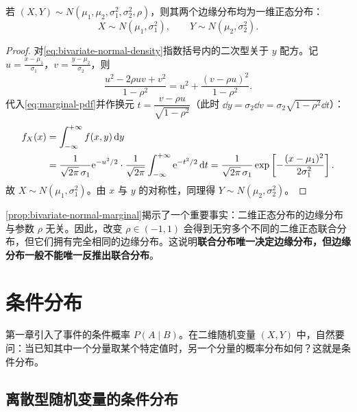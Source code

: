 \begin{proposition}[二维正态分布的边缘分布]
\label{prop:bivariate-normal-marginal}
若 $(X,Y)\sim N(\mu_1,\mu_2,\sigma_1^2,\sigma_2^2,\rho)$，则其两个边缘分布均为一维正态分布：
\[
  X\sim N(\mu_1,\sigma_1^2),\qquad Y\sim N(\mu_2,\sigma_2^2).
\]
\end{proposition}
\begin{proof}
对\eqref{eq:bivariate-normal-density}指数括号内的二次型关于 $y$ 配方。记 $u=\frac{x-\mu_1}{\sigma_1}$，$v=\frac{y-\mu_2}{\sigma_2}$，则
\[
  \frac{u^2-2\rho uv+v^2}{1-\rho^2}
  =u^2+\frac{(v-\rho u)^2}{1-\rho^2}.
\]
代入\eqref{eq:marginal-pdf}并作换元 $t=\dfrac{v-\rho u}{\sqrt{1-\rho^2}}$（此时 $\dd y=\sigma_2\dd v=\sigma_2\sqrt{1-\rho^2}\dd t$）：
\[
\begin{aligned}
  f_X(x)&=\int_{-\infty}^{+\infty}f(x,y)\mathop{}\!\mathrm{d} y\\
  &=\frac{1}{\sqrt{2\pi}\,\sigma_1}\mathrm{e}^{-u^2/2}\cdot
  \frac{1}{\sqrt{2\pi}}\int_{-\infty}^{+\infty}\mathrm{e}^{-t^2/2}\mathop{}\!\mathrm{d} t
  =\frac{1}{\sqrt{2\pi}\,\sigma_1}\exp\left[-\frac{(x-\mu_1)^2}{2\sigma_1^2}\right].
\end{aligned}
\]
故 $X\sim N(\mu_1,\sigma_1^2)$。由 $x$ 与 $y$ 的对称性，同理得 $Y\sim N(\mu_2,\sigma_2^2)$。
\end{proof}

\cref{prop:bivariate-normal-marginal}揭示了一个重要事实：二维正态分布的边缘分布与参数 $\rho$ 无关。因此，改变 $\rho\in(-1,1)$ 会得到无穷多个不同的二维正态联合分布，但它们拥有完全相同的边缘分布。这说明\textbf{联合分布唯一决定边缘分布，但边缘分布一般不能唯一反推出联合分布}。

\section{条件分布}
\label{sec:conditional-distribution}

第一章引入了事件的条件概率 $P(A\mid B)$。在二维随机变量 $(X,Y)$ 中，自然要问：当已知其中一个分量取某个特定值时，另一个分量的概率分布如何？这就是条件分布。

\subsection{离散型随机变量的条件分布}

